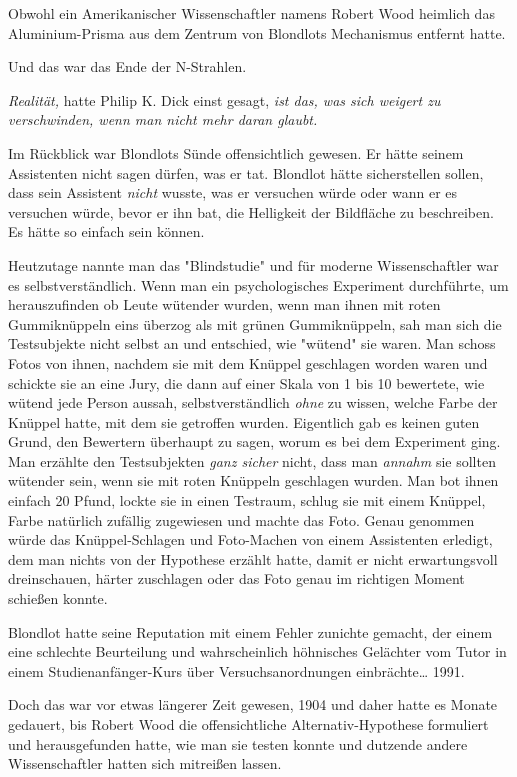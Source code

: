 {Obwohl ein Amerikanischer Wissenschaftler namens Robert Wood heimlich das Aluminium-Prisma aus dem Zentrum von Blondlots Mechanismus entfernt hatte.

Und das war das Ende der N-Strahlen.

\emph{Realität,} hatte Philip K. Dick einst gesagt, \emph{ist das, was sich weigert zu verschwinden, wenn man nicht mehr daran glaubt.}

Im Rückblick war Blondlots Sünde offensichtlich gewesen. Er hätte seinem Assistenten nicht sagen dürfen, was er tat. Blondlot hätte sicherstellen sollen, dass sein Assistent \emph{nicht} wusste, was er versuchen würde oder wann er es versuchen würde, bevor er ihn bat, die Helligkeit der Bildfläche zu beschreiben. Es hätte so einfach sein können.

Heutzutage nannte man das "Blindstudie" und für moderne Wissenschaftler war es selbstverständlich. Wenn man ein psychologisches Experiment durchführte, um herauszufinden ob Leute wütender wurden, wenn man ihnen mit roten Gummiknüppeln eins überzog als mit grünen Gummiknüppeln, sah man sich die Testsubjekte nicht selbst an und entschied, wie "wütend" sie waren. Man schoss Fotos von ihnen, nachdem sie mit dem Knüppel geschlagen worden waren und schickte sie an eine Jury, die dann auf einer Skala von 1 bis 10 bewertete, wie wütend jede Person aussah, selbstverständlich \emph{ohne} zu wissen, welche Farbe der Knüppel hatte, mit dem sie getroffen wurden. Eigentlich gab es keinen guten Grund, den Bewertern überhaupt zu sagen, worum es bei dem Experiment ging. Man erzählte den Testsubjekten \emph{ganz sicher} nicht, dass man \emph{annahm} sie sollten wütender sein, wenn sie mit roten Knüppeln geschlagen wurden. Man bot ihnen einfach 20 Pfund, lockte sie in einen Testraum, schlug sie mit einem Knüppel, Farbe natürlich zufällig zugewiesen und machte das Foto. Genau genommen würde das Knüppel-Schlagen und Foto-Machen von einem Assistenten erledigt, dem man nichts von der Hypothese erzählt hatte, damit er nicht erwartungsvoll dreinschauen, härter zuschlagen oder das Foto genau im richtigen Moment schießen konnte.

Blondlot hatte seine Reputation mit einem Fehler zunichte gemacht, der einem eine schlechte Beurteilung und wahrscheinlich höhnisches Gelächter vom Tutor in einem Studienanfänger-Kurs über Versuchsanordnungen einbrächte… 1991.

Doch das war vor etwas längerer Zeit gewesen, 1904 und daher hatte es Monate gedauert, bis Robert Wood die offensichtliche Alternativ-Hypothese formuliert und herausgefunden hatte, wie man sie testen konnte und dutzende andere Wissenschaftler hatten sich mitreißen lassen.

}
